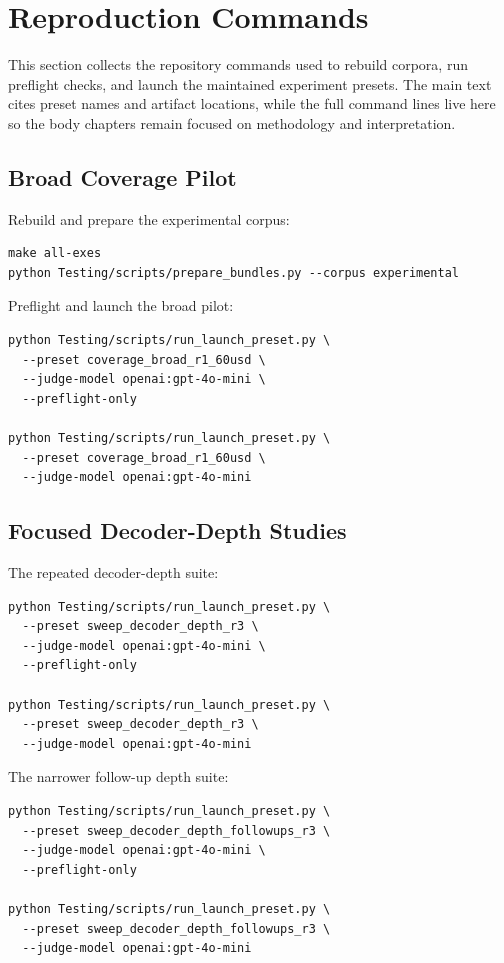 \section{Reproduction Commands}
\label{app:reproduction-commands}

This section collects the repository commands used to rebuild corpora, run preflight checks, and launch the maintained experiment presets. The main text cites preset names and artifact locations, while the full command lines live here so the body chapters remain focused on methodology and interpretation.

\subsection*{Broad Coverage Pilot}

Rebuild and prepare the experimental corpus:

\begin{verbatim}
make all-exes
python Testing/scripts/prepare_bundles.py --corpus experimental
\end{verbatim}

Preflight and launch the broad pilot:

\begin{verbatim}
python Testing/scripts/run_launch_preset.py \
  --preset coverage_broad_r1_60usd \
  --judge-model openai:gpt-4o-mini \
  --preflight-only

python Testing/scripts/run_launch_preset.py \
  --preset coverage_broad_r1_60usd \
  --judge-model openai:gpt-4o-mini
\end{verbatim}

\subsection*{Focused Decoder-Depth Studies}

The repeated decoder-depth suite:

\begin{verbatim}
python Testing/scripts/run_launch_preset.py \
  --preset sweep_decoder_depth_r3 \
  --judge-model openai:gpt-4o-mini \
  --preflight-only

python Testing/scripts/run_launch_preset.py \
  --preset sweep_decoder_depth_r3 \
  --judge-model openai:gpt-4o-mini
\end{verbatim}

The narrower follow-up depth suite:

\begin{verbatim}
python Testing/scripts/run_launch_preset.py \
  --preset sweep_decoder_depth_followups_r3 \
  --judge-model openai:gpt-4o-mini \
  --preflight-only

python Testing/scripts/run_launch_preset.py \
  --preset sweep_decoder_depth_followups_r3 \
  --judge-model openai:gpt-4o-mini
\end{verbatim}

